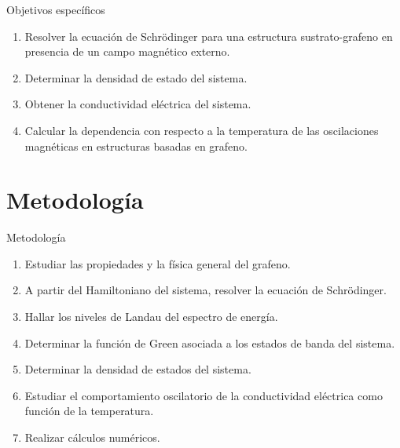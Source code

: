 	\begin{frame}{Objetivos específicos}
		\justifying
		\begin{enumerate}
			\item Resolver la ecuación de Schrödinger para una estructura sustrato-grafeno en presencia de un campo magnético externo.
			\item<2-> Determinar la densidad de estado del sistema.
			\item<3-> Obtener la conductividad eléctrica del sistema.
			\item<4-> Calcular la dependencia con respecto a la temperatura de las oscilaciones magnéticas en estructuras basadas en grafeno.
		\end{enumerate}
	\end{frame}

\section{Metodología}
	\begin{frame}{Metodología}
		\justifying
		\begin{enumerate}
			\item Estudiar las propiedades y la f\'isica general del grafeno.
			\item<2-> A partir del Hamiltoniano del sistema, resolver la ecuaci\'on de Schrödinger.
			\item<3-> Hallar los niveles de Landau del espectro de energ\'ia.
			\item<4-> Determinar la funci\'on de Green asociada a los estados de banda del sistema.
			\item<5-> Determinar la densidad de estados del sistema.
			\item<6-> Estudiar el comportamiento oscilatorio de la conductividad el\'ectrica como funci\'on de la temperatura.
			\item<7-> Realizar c\'alculos num\'ericos.
		\end{enumerate}
	\end{frame}
